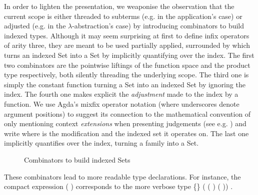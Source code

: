 In order to lighten the presentation, we weaponise the observation that the
current scope is either threaded to subterms (e.g. in the application's case)
or adjusted (e.g. in the $\lambda$-abstraction's case) by introducing combinators
to build indexed types. Although it may seem surprising at first to define
infix operators of arity three, they are meant to be used partially applied,
surrounded by \AF{[\_]} which turns an indexed Set into a Set by implicitly
quantifying over the index. The first two combinators are the pointwise liftings
of the function space and the product type respectively, both silently threading
the underlying scope. The third one is simply the constant function turning a Set
into an indexed Set by ignoring the index. The fourth one makes explicit
the \emph{adjustment} made to the index by a function. We use Agda's mixfix
operator notation (where underscores denote argument positions) to suggest its
connection to the mathematical convention of only mentioning context \emph{extensions}
when presenting judgements (see e.g. \cite{martin1982constructive}) and write
   where  is the modification and  the indexed set
it operates on. The last one implicitly quantifies over the index,
turning a family into a Set.

\begin{figure}[h]
\begin{minipage}{0.45\textwidth}
\end{minipage}\hspace{2em}
\begin{minipage}{0.45\textwidth}
\end{minipage}

\begin{minipage}{0.25\textwidth}
\end{minipage}
\begin{minipage}{0.40\textwidth}
\end{minipage}\hspace{2em}
\begin{minipage}{0.25\textwidth}
\end{minipage}
\caption{Combinators to build indexed Sets}\label{figure:indexed}
\end{figure}


These combinators lead to more readable type declarations. For instance,
the compact expression
\AF{[}   (  )   \AF{]}
corresponds to the more verbose type
 \{\}  ( ( )   ( ))   .

